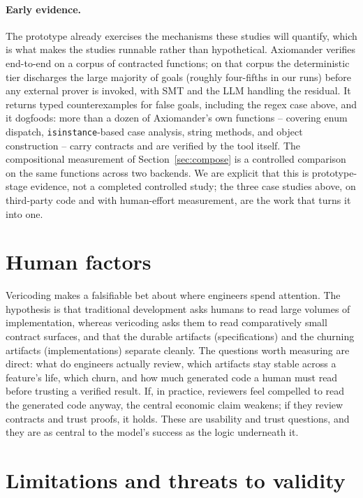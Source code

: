 \documentclass[sigconf,nonacm]{acmart}
\newcommand{\code}[1]{\texttt{#1}}
\begin{document}
\paragraph{Early evidence.} The prototype already exercises the mechanisms these
studies will quantify, which is what makes the studies runnable rather than
hypothetical. Axiomander verifies end-to-end on a corpus of contracted functions;
on that corpus the deterministic tier discharges the large majority of goals
(roughly four-fifths in our runs) before any external prover is invoked, with SMT
and the LLM handling the residual. It returns typed counterexamples for false
goals, including the regex case above, and it dogfoods: more than a dozen of
Axiomander's own functions -- covering enum dispatch, \code{isinstance}-based
case analysis, string methods, and object construction -- carry contracts and are
verified by the tool itself. The compositional measurement of
Section~\ref{sec:compose} is a controlled comparison on the same functions across
two backends. We are explicit that this is prototype-stage evidence, not a
completed controlled study; the three case studies above, on third-party code and
with human-effort measurement, are the work that turns it into one.

\section{Human factors}
\label{sec:human}

Vericoding makes a falsifiable bet about where engineers spend attention. The
hypothesis is that traditional development asks humans to read large volumes of
implementation, whereas vericoding asks them to read comparatively small contract
surfaces, and that the durable artifacts (specifications) and the churning
artifacts (implementations) separate cleanly. The questions worth measuring are
direct: what do engineers actually review, which artifacts stay stable across a
feature's life, which churn, and how much generated code a human must read before
trusting a verified result. If, in practice, reviewers feel compelled to read the
generated code anyway, the central economic claim weakens; if they review
contracts and trust proofs, it holds. These are usability and trust questions, and
they are as central to the model's success as the logic underneath it.

\section{Limitations and threats to validity}
\label{sec:limits}
\end{document}
